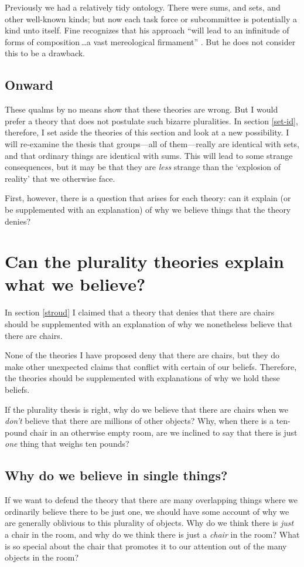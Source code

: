 \documentclass[11pt]{article}
\begin{document}
\begin{spacing}{1.5}
Previously we had a relatively tidy ontology.  There were sums, and
sets, and other well-known kinds; but now each task force or
subcommittee is potentially a kind unto itself.  Fine recognizes that
his approach ``will lead to an infinitude of forms of
composition\,\ldots a vast mereological firmament''
\citeyearpar[576]{fine2010}.  But he does not consider this to be a
drawback.

\subsection{Onward}
\label{hovda-o}
These qualms by no means show that these theories are wrong.  But I
would prefer a theory that does not postulate such bizarre
pluralities.  In section \ref{set-id}, therefore, I set aside the
theories of this section and look at a new possibility.  I will
re-examine the thesis that groups---all of them---really are identical
with sets, and that ordinary things are identical with sums.  This
will lead to some strange consequences, but it may be that they are
{\em less} strange than the `explosion of reality' that we otherwise
face.

First, however, there is a question that arises for each theory: can
it explain (or be supplemented with an explanation) of why we believe
things that the theory denies?

\section{Can the plurality theories explain what we believe?}
\label{explain-p}
In section \ref{stroud} I claimed that a theory that denies that there
are chairs should be supplemented with an explanation of why we
nonetheless believe that there are chairs.

None of the theories I have proposed deny that there are chairs, but
they do make other unexpected claims that conflict with certain of our
beliefs.  Therefore, the theories should be supplemented with
explanations of why we hold these beliefs.

If the plurality thesis is right, why do we believe that there are
chairs when we {\em don't} believe that there are millions of other
objects?  Why, when there is a ten-pound chair in an otherwise empty
room, are we inclined to say that there is just {\em one} thing that
weighs ten pounds?

\subsection{Why do we believe in single things?}
\label{exp-single}
If we want to defend the theory that there are many overlapping things
where we ordinarily believe there to be just one, we should have some
account of why we are generally oblivious to this plurality of
objects.  Why do we think there is {\em just} a chair in the room, and
why do we think there is just a {\em chair} in the room?  What is so
special about the chair that promotes it to our attention out of the
many objects in the room?


\end{spacing}
\end{document}
